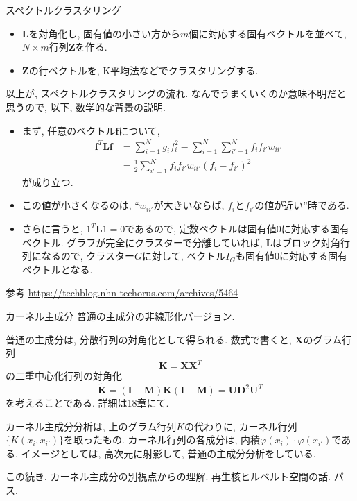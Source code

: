 \documentclass[dvipdfmx,8pt]{beamer}
\begin{document}
  \begin{frame}{スペクトルクラスタリング}
    \begin{itemize}
      \item $\mathbf{L}$を対角化し, 固有値の小さい方から$m$個に対応する固有ベクトルを並べて,
        $N\times m$行列$\mathbf{Z}$を作る.
      \item $\mathbf{Z}$の行ベクトルを, K平均法などでクラスタリングする.
    \end{itemize}
    以上が, スペクトルクラスタリングの流れ. なんでうまくいくのか意味不明だと思うので, 以下, 数学的な背景の説明.
    \begin{itemize}
      \item まず, 任意のベクトル$\mathbf{f}$について,
        \begin{eqnarray*}
          \mathbf{f}^T\mathbf{L}\mathbf{f}&=\sum_{i=1}^Ng_if_i^2-\sum_{i=1}^N\sum_{i'=1}^Nf_if_{i'}w_{ii'}\\
          &=\frac{1}{2}\sum_{i'=1}^Nf_if_{i'}w_{ii'}(f_i-f_{i'})^2
        \end{eqnarray*}
        が成り立つ.
      \item この値が小さくなるのは, ``$w_{ii'}$が大きいならば, $f_i$と$f_{i'}$の値が近い''時である.
      \item さらに言うと, $1^T\mathbf{L}1=0$であるので, 定数ベクトルは固有値$0$に対応する固有ベクトル.
        グラフが完全にクラスターで分離していれば, $\mathbf{L}$はブロック対角行列になるので,
        クラスター$G$に対して, ベクトル$I_G$も固有値0に対応する固有ベクトルとなる.
    \end{itemize}

    参考
    \url{https://techblog.nhn-techorus.com/archives/5464}
  \end{frame}
  \begin{frame}{カーネル主成分}
    普通の主成分の非線形化バージョン.

    普通の主成分は, 分散行列の対角化として得られる.
    数式で書くと, $\mathbf{X}$のグラム行列
    \[
      \mathbf{K}=\mathbf{X}\mathbf{X}^T
    \]
    の二重中心化行列の対角化
    \[
      \tilde{\mathbf{K}}=(\mathbf{I}-\mathbf{M})\mathbf{K}(\mathbf{I}-\mathbf{M})=\mathbf{U}\mathbf{D}^2\mathbf{U}^T
    \]
    を考えることである. 詳細は18章にて.

    カーネル主成分分析は, 上のグラム行列$K$の代わりに,
    カーネル行列$\{K(x_i,x_{i'})\}$を取ったもの.
    カーネル行列の各成分は, 内積$\varphi(x_i)\cdot\varphi(x_{i'})$である.
    イメージとしては, 高次元に射影して, 普通の主成分分析をしている.

    この続き, カーネル主成分の別視点からの理解.
    再生核ヒルベルト空間の話. パス.
  \end{frame}
\end{document}
